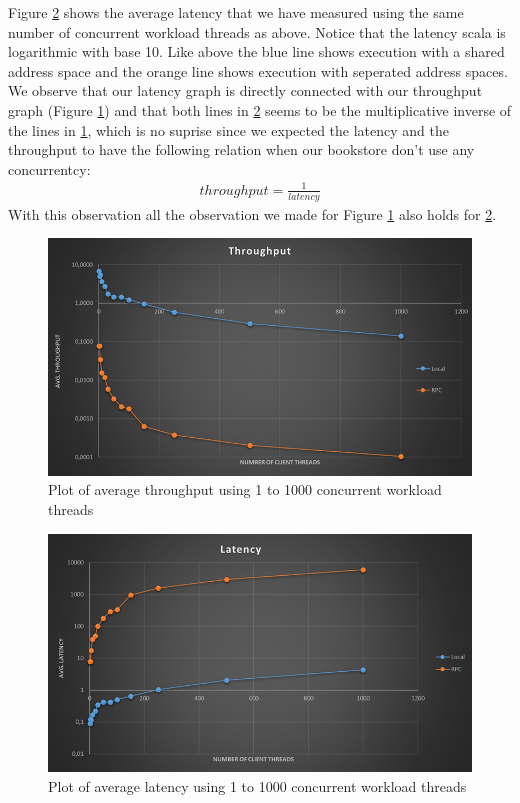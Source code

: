 \documentclass[10pt,a4paper]{article}
\begin{document}
\begin{enumerate}
	Figure \ref{fig2} shows the average latency that we have measured using the same number of concurrent workload threads as above. Notice that the latency scala is logarithmic with base 10. Like above the blue line shows execution with a shared address space and the orange line shows execution with seperated address spaces. We observe that our latency graph is directly connected with our throughput graph (Figure \ref{fig1}) and that both lines in \ref{fig2} seems to be the multiplicative inverse of the lines in \ref{fig1}, which is no suprise since we expected the latency and the throughput to have the following relation when our bookstore don't use any concurrentcy:
	\begin{align*}
		throughput = \frac{1}{latency}
	\end{align*}
	With this observation all the observation we made for Figure \ref{fig1} also holds for \ref{fig2}.
	\begin{center}
		\begin{figure}
				\includegraphics[scale=0.6]{throughput.png}
				\caption{Plot of average throughput using 1 to 1000 concurrent workload threads}
				\label{fig1}
		\end{figure}
		\begin{figure}
				\includegraphics[scale=0.6]{latency.png}
				\caption{Plot of average latency using 1 to 1000 concurrent workload threads}				
				\label{fig2}
		\end{figure}
	\end{center}
\end{enumerate}
\end{document}
